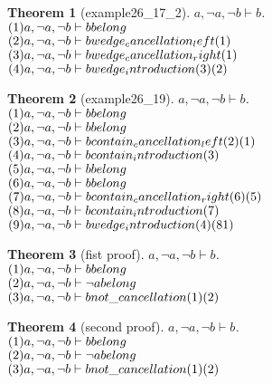 \documentclass[11pt]{article}
\newtheorem{theorem}{Theorem}
\def\turn{\vdash}
\begin{document}
\begin{theorem}[example26_17_2] $ a, \neg a, \neg b \turn b $.\\
$(1)a, \neg a, \neg b \turn b \hfill belong  $\\
$(2)a, \neg a, \neg b \turn b \hfill wedge_cancellation_left (1) $\\
$(3)a, \neg a, \neg b \turn b \hfill wedge_cancellation_right (1) $\\
$(4)a, \neg a, \neg b \turn b \hfill wedge_introduction (3)(2) $\\
\end{theorem}
\begin{theorem}[example26_19] $ a, \neg a, \neg b \turn b $.\\
$(1)a, \neg a, \neg b \turn b \hfill belong  $\\
$(2)a, \neg a, \neg b \turn b \hfill belong  $\\
$(3)a, \neg a, \neg b \turn b \hfill contain_cancellation_left (2)(1) $\\
$(4)a, \neg a, \neg b \turn b \hfill contain_introduction (3) $\\
$(5)a, \neg a, \neg b \turn b \hfill belong  $\\
$(6)a, \neg a, \neg b \turn b \hfill belong  $\\
$(7)a, \neg a, \neg b \turn b \hfill contain_cancellation_right (6)(5) $\\
$(8)a, \neg a, \neg b \turn b \hfill contain_introduction (7) $\\
$(9)a, \neg a, \neg b \turn b \hfill wedge_introduction (4)(81) $\\
\end{theorem}
\begin{theorem}[fist proof] $ a, \neg a, \neg b \turn b $.\\
$(1)a, \neg a, \neg b \turn b \hfill belong $\\
$(2)a, \neg a, \neg b \turn \neg a \hfill belong $\\
$(3)a, \neg a, \neg b \turn b \hfill not \_ cancellation (1)(2) $\\
\end{theorem}
\begin{theorem}[second proof] $ a, \neg a, \neg b \turn b $.\\
$(1)a, \neg a, \neg b \turn b \hfill belong $\\
$(2)a, \neg a, \neg b \turn \neg a \hfill belong $\\
$(3)a, \neg a, \neg b \turn b \hfill not \_ cancellation (1)(2) $\\
\end{theorem}
\end{document}
